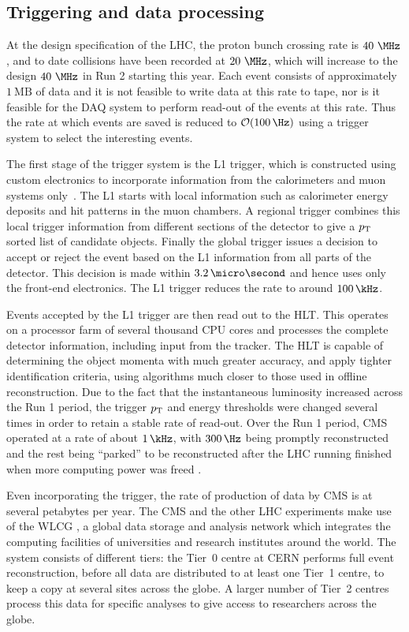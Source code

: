 \subsection{Triggering and data processing}
\label{sec:trigger}

At the design specification of the LHC, the proton bunch crossing rate is
$40~\MHz$, and to date collisions have been recorded at $20~\MHz$, which will
increase to the design $40~\MHz$ in Run 2 starting this year. Each event
consists of approximately $1~\text{MB}$ of data and it is not feasible to write
data at this rate to tape, nor is it feasible for the \ac{DAQ} system to perform
read-out of the events at this rate. Thus the rate at which events are saved is
reduced to $\mathcal{O}(100\,\Hz)$ using a trigger system to select the
interesting events.

The first stage of the trigger system is the \ac{L1} trigger, which is
constructed using custom electronics to incorporate information from the
calorimeters and muon systems only~\cite{Chatrchyan:2008aa}. The \ac{L1} starts with local information
such as calorimeter energy deposits and hit patterns in the muon chambers. A
regional trigger combines this local trigger information from different sections
of the detector to give a $p_{\mathrm{T}}$ sorted list of candidate objects. Finally the
global trigger issues a decision to accept or reject the event based on the
\ac{L1} information from all parts of the detector. This decision is made within
$3.2\,\micro\second$ and hence uses only the front-end electronics. The \ac{L1}
trigger reduces the rate to around $100\,\kHz$.  

Events accepted by the \ac{L1} trigger are then read out to the \ac{HLT}. This
operates on a processor farm of several thousand CPU cores and processes the 
complete detector information, including input from the tracker. The \ac{HLT}
is capable of determining the object momenta with much greater accuracy, and
apply tighter identification criteria, using algorithms much closer to those
used in offline reconstruction. Due to the fact that the instantaneous luminosity
increased across the Run 1 period, the trigger $p_{\mathrm{T}}$ and energy thresholds were
changed several times in order to retain a stable rate of read-out. Over the Run
1 period, CMS operated at a rate of about $1\,\kHz$, with $300\,\Hz$ being promptly
reconstructed and the rest being ``parked'' to be reconstructed after the LHC running
finished when more computing power was freed \cite{CMS:2012ooa}.

Even incorporating the trigger, the rate of production of data by CMS is at
several petabytes per year. The CMS and the other LHC experiments make use of
the \ac{WLCG} \cite{web:grid}, a global data storage and analysis network which
integrates the computing facilities of universities and research institutes
around the world. The system consists of different tiers: the Tier~0 centre at
CERN performs full event reconstruction, before all data are distributed to at
least one Tier~1 centre, to keep a copy at several sites across the globe. A
larger number of Tier~2 centres process this data for specific analyses to give
access to researchers across the globe. 
